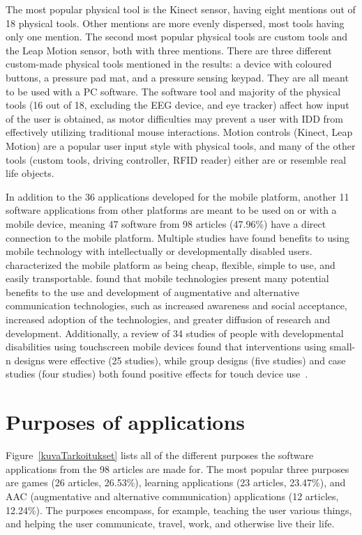 \documentclass[utf8,english]{gradu3}
\begin{document}
The most popular physical tool is the Kinect sensor, having eight mentions out of 18 physical tools.
Other mentions are more evenly dispersed, most tools having only one mention.
The second most popular physical tools are custom tools and the Leap Motion
sensor, both with three mentions.
There are three different custom-made physical tools mentioned in the results:
a device with coloured buttons, a pressure pad mat, and a pressure sensing keypad.
They are all meant to be used with a PC software.
The software tool and majority of the physical tools (16 out of 18, excluding the EEG device, and eye tracker)
affect how input of the user is obtained, as motor difficulties may prevent
a user with IDD from effectively utilizing traditional mouse interactions.
Motion controls (Kinect, Leap Motion) are a popular user input style with physical tools,
and many of the other tools (custom tools, driving controller, RFID reader) either
are or resemble real life objects.

In addition to the 36 applications developed for the mobile platform, another 11 software applications
from other platforms are meant to be used on or with a mobile device,
meaning 47 software from 98 articles (47.96\%) have a direct connection to the mobile platform.
Multiple studies have found benefits to using mobile technology with intellectually or developmentally disabled users.
\textcite{artoni2013portable} characterized the mobile platform as being cheap, flexible, simple to use, and easily transportable.
\textcite{mcnaughton2013} found that mobile technologies present many potential benefits to the use and development of
augmentative and alternative communication technologies,
such as increased awareness and social acceptance, increased adoption of the technologies,
and greater diffusion of research and development.
Additionally, a review of 34 studies of people with developmental disabilities using touchscreen mobile devices found
that interventions using small-n designs were effective (25 studies), while group designs (five studies) and
case studies (four studies) both found positive effects for touch device use~\parencite{stephenson2015}.


\section{Purposes of applications} %

Figure~\ref{kuvaTarkoitukset} lists all of the different purposes the software applications from the
98 articles are made for. The most popular three purposes are
games (26 articles, 26.53\%), learning applications (23 articles, 23.47\%),
and AAC (augmentative and alternative communication) applications (12 articles, 12.24\%).
The purposes encompass, for example, teaching the user various things, and
helping the user communicate, travel, work, and otherwise live their life.
\end{document}

